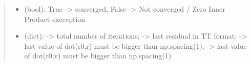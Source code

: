 \documentclass[a4paper,10pt,english]{sphinxmanual}
\begin{document}
\begin{fulllineitems}
\begin{quote}
\begin{description}
\begin{itemize}
\item {} 
 (bool): True -\textgreater{} converged, False -\textgreater{} Not converged / Zero Inner Product exeception

\item {} 
 (dict):  -\textgreater{} total number of iterations;  -\textgreater{} last residual in TT format;  -\textgreater{} last value of dot(r0,r) must be bigger than np.spacing(1);  -\textgreater{} last value of dot(r0,v) must be bigger than np.spacing(1)

\end{itemize}


\end{description}\end{quote}

\end{fulllineitems}

\end{document}
